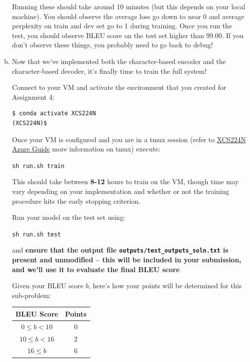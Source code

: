 \begin{enumerate}[(a)]
    Running these should take around 10 minutes (but this depends on your local machine). 
    You should observe the average loss go down to near 0 and average perplexity on train and dev set go to 1 during training. Once you run the test, you should observe BLEU score on the test set higher than 99.00. 
    If you don't observe these things, you probably need to go back to debug!
    
    \item {} \label{qn:final_train} Now that we've implemented both the character-based encoder and the character-based decoder, it's finally time to train the full system!

    Connect to your VM and activate the environment that you created for Assignment 4:
\begin{lstlisting}
$ conda activate XCS224N
(XCS224N)$
\end{lstlisting}

        Once your VM is configured and you are in a tmux session (refer to \href{https://docs.google.com/document/d/10J520Vnb1LnAMo0qgSYpG5cEEbomqQ371NIqg1IAv-4/edit?usp=sharing}{XCS224N Azure Guide} more information on tmux) execute:
        \begin{center}
            \texttt{sh run.sh train}
        \end{center}
    This should take between \textbf{8-12} hours to train on the VM, though time may vary depending on your implementation and whether or not the training procedure hits the early stopping criterion. 
    
    Run your model on the test set using:
        \begin{center}
            \texttt{sh run.sh test}
        \end{center}
    and \textbf{ensure that the output file \texttt{outputs/test\_outputs\_soln.txt} is present and unmodified -- this will be included in your submission, and we'll use it to evaluate the final BLEU score}
    
    Given your BLEU score $b$, here's how your points will be determined for this sub-problem: \newline \\
    \begin{tabular}{c c}
        BLEU Score & Points \\ \hline 
        $0 \le b < 10 $ & 0 \\ %
        $10 \le b < 16$ & 2 \\ %
        $16 \le b$ & 6 \\ %
    \end{tabular}

\end{enumerate}
\clearpage

